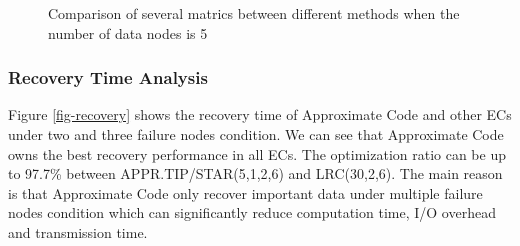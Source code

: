 \documentclass[sigconf]{acmart}
\begin{document}
\begin{figure}[!ht]
\vspace{-3mm}
\caption{Comparison of several matrics between different methods when the number of data nodes is 5}\label{fig-BAR}\vspace{-3mm}
\end{figure}

\subsubsection{Recovery Time Analysis}

Figure \ref{fig-recovery} shows the recovery time of Approximate Code and other ECs under two and three failure nodes
condition. We can see that Approximate Code owns the best recovery performance in all ECs. The optimization ratio can be up to 97.7\% between APPR.TIP/STAR(5,1,2,6) and LRC(30,2,6). The main reason is that Approximate Code only recover important data under multiple failure nodes condition which can significantly reduce computation time, I/O overhead and transmission time.
\end{document}
